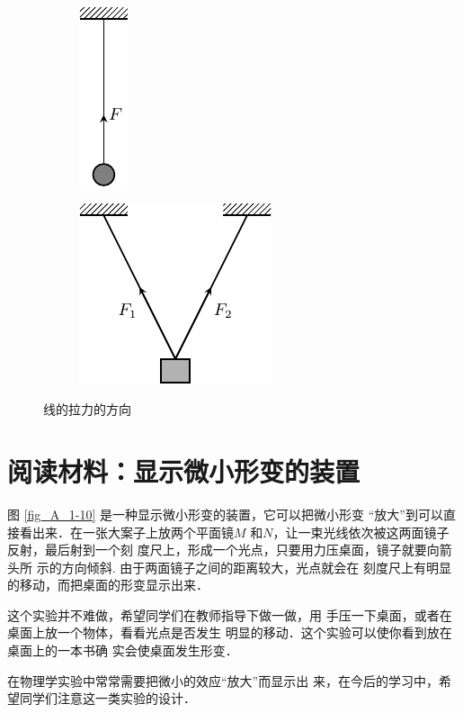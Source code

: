 \begin{figure} [htp]\centering
\begin{subfigure} {0.46\linewidth} 
	\centering
	\includegraphics{fig/A/1-9a.pdf} 
	\caption{} \label{fig_A_1-9a} 
\end{subfigure} 
\hfil
\begin{subfigure} {0.46\linewidth} 
	\centering
	\includegraphics{fig/A/1-9b.pdf} 
	\caption{} \label{fig_A_1-9b} 
\end{subfigure} 
\caption{线的拉力的方向} \label{fig_A_1-9} 
\end{figure} 

\section*{阅读材料：显示微小形变的装置} 


图 \ref{fig_A_1-10} 是一种显示微小形变的装置，它可以把微小形变
“放大”到可以直接看出来．在一张大案子上放两个平面镜$M$
和$N$，让一束光线依次被这两面镜子反射，最后射到一个刻
度尺上，形成一个光点，只要用力压桌面，镜子就要向箭头所
示的方向倾斜. 由于两面镜子之间的距离较大，光点就会在
刻度尺上有明显的移动，而把桌面的形变显示出来．

    这个实验并不难做，希望同学们在教师指导下做一做，用
手压一下桌面，或者在桌面上放一个物体，看看光点是否发生
明显的移动．这个实验可以使你看到放在桌面上的一本书确
实会使桌面发生形变．

    在物理学实验中常常需要把微小的效应“放大”而显示出
来，在今后的学习中，希望同学们注意这一类实验的设计．

